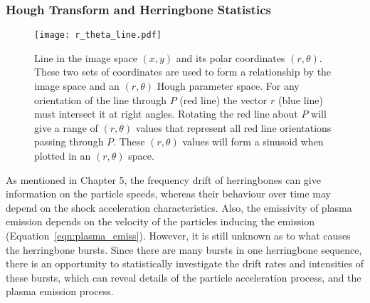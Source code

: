 \subsubsection{Hough Transform and Herringbone Statistics}
\begin{figure}[t!]
\begin{center}
\texttt{[image: r\_theta\_line.pdf]}
\caption[Line in polar coordinates]{Line in the image space $(x,y)$ and its polar coordinates $(r, \theta)$. These two sets of coordinates are used to form a relationship by the image space and an $(r, \theta)$ Hough parameter space. For any orientation of the line through $P$ (red line) the vector $r$ (blue line) must intersect it at right angles. Rotating the red line about $P$ will give a range of $(r, \theta)$ values that represent all red line orientations passing through $P$. These $(r, \theta)$ values will form a sinusoid when plotted in an $(r, \theta)$ space.}
\label{fig:r_theta_line}
\end{center}
\end{figure}
As mentioned in Chapter 5, the frequency drift of herringbones can give information on the particle speeds, whereas their behaviour over time may depend on the shock acceleration characteristics. Also, the emissivity of plasma emission depends on the velocity of the particles inducing the emission (Equation~\ref{eqn:plasma_emiss}). However, it is still unknown as to what causes the herringbone bursts. Since there are many bursts in one herringbone sequence, there is an opportunity to statistically investigate the drift rates and intensities of these bursts, which can reveal details of the particle acceleration process, and the plasma emission process.

